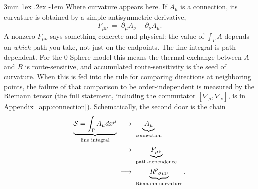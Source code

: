 \documentclass[%
 reprint, amsmath,amssymb, aps, prb, ]{revtex4-2}
\makeatletter
\numberwithin{equation}{section}
\renewcommand\paragraph{%
  \@startsection{paragraph}{4}{\z@}%
    {3mm \@plus 1ex \@minus .2ex}%
    {-1em}%
    {\normalfont\normalsize\itshape}}
\makeatother
\begin{document}
\paragraph{Where curvature appears here.}
If $A_\mu$ is a connection, its curvature is obtained by a simple antisymmetric derivative,
\begin{equation}
F_{\mu\nu} \;=\; \partial_\mu A_\nu - \partial_\nu A_\mu .
\label{eq:F-abelian}
\end{equation}
A nonzero $F_{\mu\nu}$ says something concrete and physical: the value of $\int_\Gamma A$ depends on \emph{which} path you take, not just on the endpoints. The line integral is path-dependent. For the 0-Sphere model this means the thermal exchange between $A$ and $B$ is route-sensitive, and accumulated route-sensitivity is the seed of curvature. When this is fed into the rule for comparing directions at neighboring points, the failure of that comparison to be order-independent is measured by the Riemann tensor (the full statement, including the commutator $[\nabla_\mu,\nabla_\nu]$, is in Appendix~\ref{app:connection}). Schematically, the second door is the chain
\begin{align}
\underbrace{\mathcal{S}=\int_\Gamma A_\mu dx^\mu}_{\text{line integral}}
&\;\longrightarrow\;
\underbrace{A_\mu}_{\text{connection}}
\notag\\
&\;\longrightarrow\;
\underbrace{F_{\mu\nu}}_{\text{path-dependence}}
\notag\\
&\;\longrightarrow\;
\underbrace{R^\rho{}_{\sigma\mu\nu}}_{\text{Riemann curvature}}.
\label{eq:gauge-chain}
\end{align}
\end{document}

